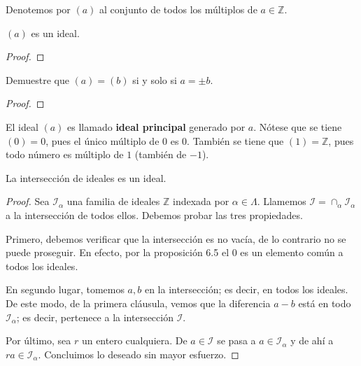 \documentclass[main.tex]{subfiles}
\begin{document}
\begin{notation}
    Denotemos por $(a)$ al conjunto de todos los m\'ultiplos de $a \in \mathbb Z$.
\end{notation}

\begin{lemma}
    $(a)$ es un ideal.
\end{lemma}

\begin{proof}
    
\end{proof}

\begin{theorem}
    Demuestre que $(a) = (b)$ si y solo si $a = \pm b$.
\end{theorem}

\begin{proof}
    
\end{proof}

El ideal $(a)$ es llamado {\bf ideal principal} generado por $a$. N\'otese que se tiene $(0) = {0}$, pues el \'unico m\'ultiplo de $0$ es $0$. Tambi\'en se tiene que $(1) = \mathbb Z$, pues todo n\'umero es m\'ultiplo de $1$ (tambi\'en de $-1$).

\begin{lemma}
    La intersecci\'on de ideales es un ideal.
\end{lemma}

\begin{proof}
    Sea $\mathcal{I}_\alpha$ una familia de ideales $\mathbb Z$ indexada por $\alpha \in \Lambda$. Llamemos $\mathcal{I} = \cap_\alpha \mathcal{I}_\alpha$ a la intersecci\'on de todos ellos. Debemos probar las tres propiedades.
    
    Primero, debemos verificar que la intersecci\'on es no vac\'ia, de lo contrario no se puede proseguir. En efecto, por la proposici\'on 6.5 el $0$ es un elemento com\'un a todos los ideales.
    
    En segundo lugar, tomemos $a, b$ en la intersecci\'on; es decir, en todos los ideales. De este modo, de la primera cl\'ausula, vemos que la diferencia $a - b$ est\'a en todo $\mathcal{I}_\alpha$; es decir, pertenece a la intersecci\'on $\mathcal{I}$.
    
    Por \'ultimo, sea $r$ un entero cualquiera. De $a \in \mathcal{I}$ se pasa a $a \in \mathcal{I}_\alpha$ y de ah\'i a $ra \in \mathcal{I}_\alpha$. Concluimos lo deseado sin mayor esfuerzo.
\end{proof}
\end{document}
